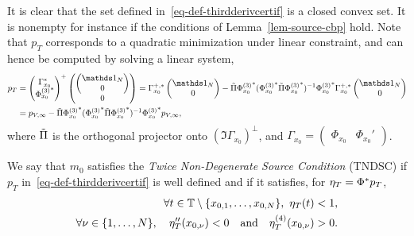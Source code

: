 It is clear that the set defined in~\eqref{eq-def-thirdderivcertif} is a closed convex set. It is nonempty for instance if the conditions of Lemma~\ref{lem-source-cbp} hold. Note that $p_T$ corresponds to a quadratic minimization under linear constraint, and can hence be computed by solving a linear system,
\begin{align}
  p_T &= \begin{pmatrix}\Gamma_{x_0}^*\\{\Phi_{x_0}^{(3)}}^* \end{pmatrix}^+
  \begin{pmatrix}\begin{pmatrix}\bun_N\\0\end{pmatrix}\\ 0\end{pmatrix}
  = \Gamma_{x_0}^{+,*}\begin{pmatrix}\bun_N\\0\end{pmatrix}-\projGam {\Phi_{x_0}^{(3)}}^* ({\Phi_{x_0}^{(3)}}^*\projGam{\Phi_{x_0}^{(3)}}^*)^{-1}{\Phi_{x_0}^{(3)}}^* \Gamma_{x_0}^{+,*}\begin{pmatrix}\bun_N\\0\end{pmatrix}\label{eq-qt-expression}\\
&= \pvanishing -\projGam {\Phi_{x_0}^{(3)}}^* ({\Phi_{x_0}^{(3)}}^*\projGam{\Phi_{x_0}^{(3)}}^*)^{-1}{\Phi_{x_0}^{(3)}}^*\pvanishing,
\end{align}
where $\tilde{\Pi}$ is the orthogonal projector onto $(\Im \Gamma_{x_0})^\perp$, and $\Gamma_{x_0}=\begin{pmatrix} \Phi_{x_0} & \Phi_{x_0}'\end{pmatrix}$.

\begin{defn}\label{defn-TNDSC}
  We say that $m_0$ satisfies the \textit{Twice Non-Degenerate Source Condition} (TNDSC) if $p_T$ in~\eqref{eq-def-thirdderivcertif} is well defined and if it satisfies, for $\eta_T=\Phi^*p_T$,
  \begin{align*}
    \forall t\in \TT\setminus \{x_{0,1},\ldots ,x_{0,N} \},\ \mut(t)<1,\\
    \forall \nu\in \{1,\ldots, N\},\quad    \mut''(x_{0,\nu})<0 \qandq \mut^{(4)}(x_{0,\nu})>0.
  \end{align*}
\end{defn}

